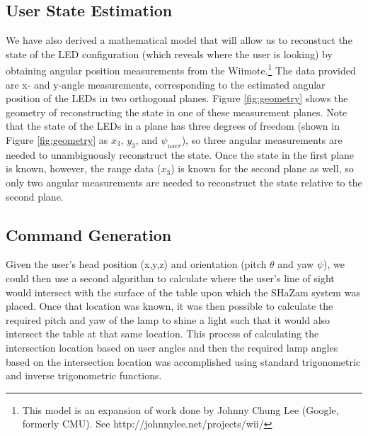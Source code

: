 \documentclass[conference, twocolumn]{IEEEtran}
\begin{document}
\subsection*{User State Estimation}
We have also derived a mathematical model that will allow us to reconstuct the state of the LED configuration (which reveals where the user is looking) by obtaining angular position measurements from the Wiimote.\footnote{This model is an expansion of work done by Johnny Chung Lee (Google, formerly CMU). See http://johnnylee.net/projects/wii/} The data provided are x- and y-angle measurements, corresponding to the estimated angular position of the LEDs in two orthogonal planes. Figure \ref{fig:geometry} shows the geometry of reconstructing the state in one of these measurement planes. Note that the state of the LEDs in a plane has three degrees of freedom (shown in Figure \ref{fig:geometry} as $x_{3}$, $y_{3}$, and $\psi_{user}$), so three angular measurements are needed to unambiguously reconstruct the state. Once the state in the first plane is known, however, the range data ($x_3$) is known for the second plane as well, so only two angular measurements are needed to reconstruct the state relative to the second plane. 

\subsection*{Command Generation}
Given the user's head position (x,y,z) and orientation (pitch $\theta$ and yaw $\psi$), we could then use a second algorithm to calculate where the user's line of sight would intersect with the surface of the table upon which the SHaZam system was placed. Once that location was known, it was then possible to calculate the required pitch and yaw of the lamp to shine a light such that it would also intersect the table at that same location. This process of calculating the intersection location based on user angles and then the required lamp angles based on the intersection location was accomplished using standard trigonometric and inverse trigonometric functions.
\end{document}
